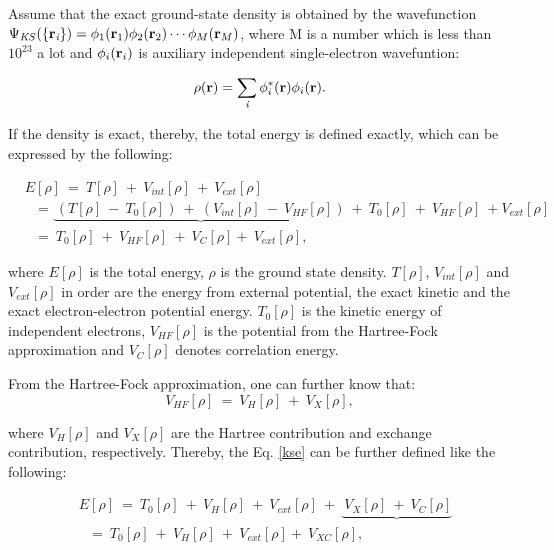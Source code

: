\documentclass[a4paper, 12pt, titlepage,oneside,drop]{kthesis}
\begin{document}
Assume that the exact ground-state density is obtained by the wavefunction $\wfks = \bwf<1><1> \bwf<2><2> \cdots \bwf<M><M>$, where M is a number which is 
less than $10^{23}$ a lot and $\bwf<i><i>$ is auxiliary independent single-electron wavefuntion:

\begin{equation}\label{ks1}
 \rho(\textbf{r}) = \sumi<i> {\phi^{*}_{i}(\textbf{r})} {\phi_{i}(\textbf{r})}.
\end{equation}

If the density is exact, thereby, the total energy is defined exactly, which can be expressed by the following:

\begin{equation}\label{kse}
\begin{split}
&E[\rho] \ =\ T[\rho] \ + \ V_\textit{int}[\rho] \ + \ V_\textit{ext}[\rho]  \\
&\ \ \   = \underbrace{\ (T[\rho] \ - \ T_{0}[\rho]) \ + \  (V_\textit{int}[\rho] \ - \ V_\textit{HF}[\rho])\ }+ \ T_{0}[\rho] \ + \ V_\textit{HF}[\rho] \ + V_\textit{ext}[\rho]       \\
&\ \ \   = \ T_{0}[\rho] \ + \ V_\textit{HF}[\rho] \ + \ V_\textit{C}[\rho] +\ V_\textit{ext}[\rho],
\end{split}
\end{equation}

where $E[\rho]$  is the total energy, $\rho$ is the ground state density. $T[\rho]$, $V_\textit{int}[\rho]$ and $V_\textit{ext}[\rho]$ in order are the energy from external potential, the exact kinetic 
and the exact electron-electron potential energy. $T_{0}[\rho]$ is the kinetic energy of independent electrons, $V_\textit{HF}[\rho]$ is the potential from the Hartree-Fock approximation and $V_\textit{C}[\rho]$
denotes correlation energy.

From the Hartree-Fock approximation, one can further know that:
\begin{equation}
 V_\textit{HF}[\rho] \ = \ V_\textit{H}[\rho] \ + \ V_\textit{X}[\rho], 
\end{equation}

where $V_\textit{H}[\rho]$ and $ V_\textit{X}[\rho] $ are the Hartree contribution and exchange contribution, respectively. Thereby, the Eq. \ref{kse} can be further defined like
 the following:

\begin{equation}\label{ccc}
\begin{split}
&E[\rho]\ = \ T_{0}[\rho] \ + \ V_\textit{H}[\rho] \ + \ V_\textit{ext}[\rho] \ + \ \underbrace{\ V_\textit{X}[\rho]  \ + \ V_\textit{C}[\rho]}  \\
&\ \ \ = \ T_{0}[\rho] \ + \ V_\textit{H}[\rho] \ + \ V_\textit{ext}[\rho] + \ V_\textit{XC}[\rho],
\end{split}\end{equation}
\end{document}
